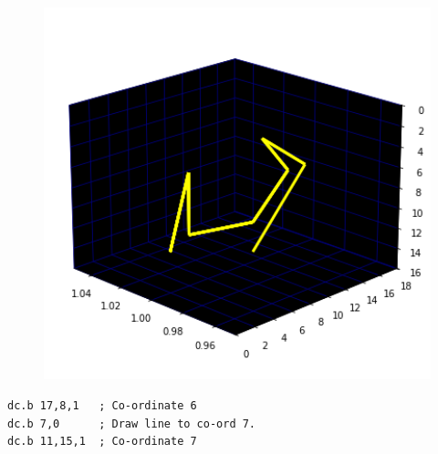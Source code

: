 \begin{minipage}[c]{0.48\linewidth}
\begin{figure}[H]
    \centering
    \begin{adjustbox}{width=5.5cm,center}
      \includegraphics[width=12cm]{src/claws/build_claw_6_0.png}%
    \end{adjustbox}
\end{figure}
\end{minipage}
\begin{minipage}[c]{0.48\linewidth}
\begin{lstlisting}[basicstyle=\scriptsize\ttfamily]
dc.b 17,8,1   ; Co-ordinate 6
dc.b 7,0      ; Draw line to co-ord 7.
dc.b 11,15,1  ; Co-ordinate 7
\end{lstlisting}
\vspace*{\fill}
\end{minipage}

